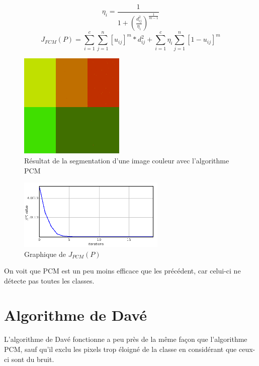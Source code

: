 \documentclass[a4paper,11pt]{article}
\begin{document}
\begin{equation}
  \label{uijPCM}
  \eta_i = \frac{1}{1+\left(\frac{d_{ij}^2}{\eta_i}\right)^{\frac{1}{m-1}}}
\end{equation}
\begin{equation}
  \label{jPCM}
  J_{FCM}(P)=\sum_{i=1}^{c}\sum_{j=1}^{n}[u_{ij}]^m * d_{ij}^2+\sum_{i=1}^{c}\eta_i \sum_{j=1}^{n}[1 - u_{ij}]^m
\end{equation}

\begin{figure}[!h]
  \begin{center}
    \includegraphics[width=5cm]{resultat/PCM.png}
    \caption{Résultat de la segmentation d'une image couleur avec l'algorithme PCM}
    \label{fig:pcm}
  \end{center}
\end{figure}

\begin{figure}[!h]
  \begin{center}
    \includegraphics[width=7cm]{resultat/PCM_graph.png}
    \caption{Graphique de $J_{PCM}(P)$}
    \label{fig:graphPCM}
  \end{center}
\end{figure}

On voit que PCM est un peu moins efficace que les précédent, car celui-ci ne détecte pas toutes les classes.

\section{Algorithme de Davé}
L'algorithme de Davé fonctionne a peu près de la même façon que l'algorithme PCM, sauf qu'il exclu
les pixels trop éloigné de la classe en considérant que ceux-ci sont du bruit.
\end{document}
